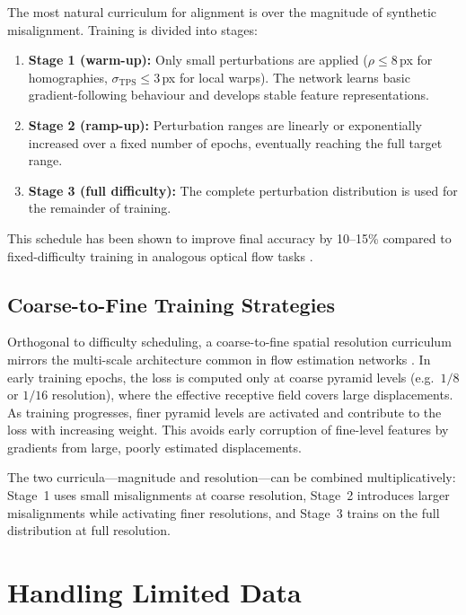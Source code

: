 The most natural curriculum for alignment is over the magnitude of synthetic
misalignment.  Training is divided into stages:
\begin{enumerate}
    \item \textbf{Stage 1 (warm-up):} Only small perturbations are applied
          ($\rho \leq 8$\,px for homographies, $\sigma_{\mathrm{TPS}} \leq 3$\,px
          for local warps).  The network learns basic gradient-following
          behaviour and develops stable feature representations.
    \item \textbf{Stage 2 (ramp-up):} Perturbation ranges are linearly or
          exponentially increased over a fixed number of epochs, eventually
          reaching the full target range.
    \item \textbf{Stage 3 (full difficulty):} The complete perturbation
          distribution is used for the remainder of training.
\end{enumerate}
This schedule has been shown to improve final accuracy by 10--15\% compared
to fixed-difficulty training in analogous optical flow tasks
\cite{ilg2017flownet2}.

\subsection{Coarse-to-Fine Training Strategies}
\label{subsec:coarse_to_fine}

Orthogonal to difficulty scheduling, a coarse-to-fine spatial resolution
curriculum mirrors the multi-scale architecture common in flow estimation
networks \cite{sun2018pwcnet, teed2020raft}.  In early training epochs, the
loss is computed only at coarse pyramid levels (e.g.\ $1/8$ or $1/16$
resolution), where the effective receptive field covers large displacements.
As training progresses, finer pyramid levels are activated and contribute to
the loss with increasing weight.  This avoids early corruption of fine-level
features by gradients from large, poorly estimated displacements.

The two curricula---magnitude and resolution---can be combined
multiplicatively: Stage~1 uses small misalignments at coarse resolution,
Stage~2 introduces larger misalignments while activating finer resolutions,
and Stage~3 trains on the full distribution at full resolution.


\section{Handling Limited Data}
\label{sec:limited_data}

